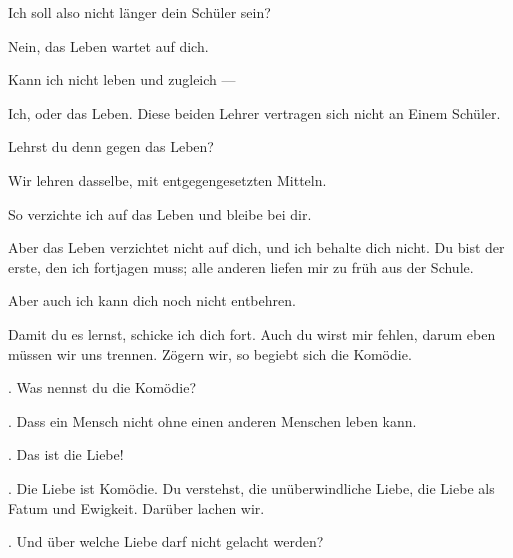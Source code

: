  Ich soll also nicht länger dein Schüler sein?
\par

 Nein, das Leben wartet auf dich.
\par

 Kann ich nicht leben und zugleich —
\par

 Ich, oder das Leben. Diese beiden Lehrer vertragen sich nicht an Einem Schüler.
\par

 Lehrst du denn gegen das Leben?
\par

 Wir lehren dasselbe, mit entgegengesetzten Mitteln.
\par

 So verzichte ich auf das Leben und bleibe bei dir.
\par

 Aber das Leben verzichtet nicht auf dich, und ich behalte dich nicht. Du bist der erste, den ich fortjagen muss; alle anderen liefen mir zu früh aus der Schule.
\par

 Aber auch ich kann dich noch nicht entbehren.
\par

 Damit du es lernst, schicke ich dich fort. Auch du wirst mir fehlen, darum eben müssen wir uns trennen. Zögern wir, so begiebt sich die Komödie.
\par

. Was nennst du die Komödie?
\par

. Dass ein Mensch nicht ohne einen anderen Menschen leben kann.
\par

. Das ist die Liebe!
\par

. Die Liebe ist Komödie. Du verstehst, die unüberwindliche Liebe, die Liebe als Fatum und Ewigkeit. Darüber lachen wir.
\par

. Und über welche Liebe darf nicht gelacht werden?
\par

